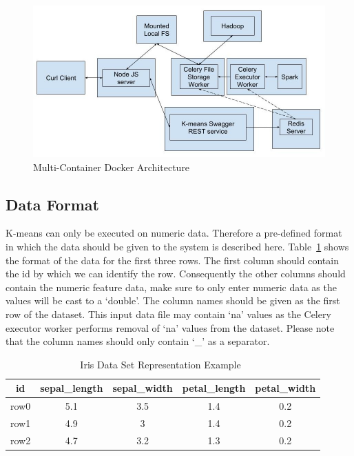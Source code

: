\begin{figure}[htbp] 
	\centering
	\includegraphics[width=\columnwidth]{images/dockerarchitecture.jpg}
	\caption{Multi-Container Docker Architecture}
\label{fig:multicontainerdocker} 
\end{figure}

\subsection{Data Format}
\label{sec:dataformat}

K-means can only be executed on numeric data. Therefore a pre-defined format 
in which the data should be given to the system is described here. 
Table~\ref{tab:dataformatexample} shows the format of the data for the first 
three rows. The first column should contain the id by which we can identify 
the row. Consequently the other columns should contain the numeric feature 
data, make sure to only enter numeric data as the values will be cast to a 
`double'. The column names should be given as the first row of the dataset. 
This input data file may contain `na' values as the Celery executor worker 
performs removal of `na' values from the dataset. Please note that the column 
names should only contain `\_' as a separator.

\begin{table}[htbp]
\caption{Iris Data Set Representation 
	Example~\cite{hid-sp18-416-www-iris-dataset}}\label{tab:dataformatexample}
	\centering
	\begin{tabular}{*{5}{c}}
		\toprule
		id   & sepal\_length   & sepal\_width  & petal\_length   & 
		petal\_width   \\
		\midrule
		row0 & 5.1 & 3.5 & 1.4 & 0.2 \\
		row1 & 4.9 & 3   & 1.4 & 0.2 \\
		row2 & 4.7 & 3.2 & 1.3 & 0.2 \\
		\bottomrule
	\end{tabular}
\end{table}

